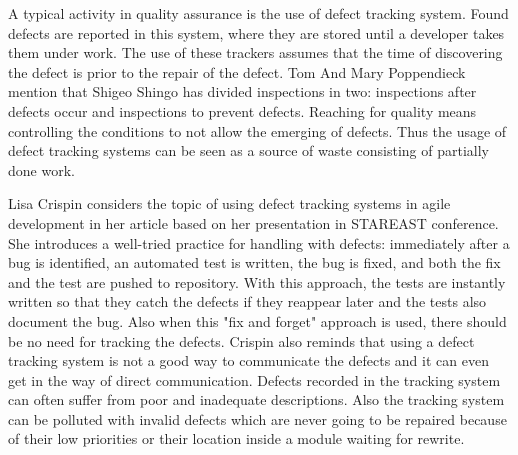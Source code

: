 A typical activity in quality assurance is the use of defect tracking system. Found defects are reported in this system, where they are stored until a developer takes them under work. The use of these trackers assumes that the time of discovering the defect is prior to the repair of the defect. Tom And Mary Poppendieck mention that Shigeo Shingo has divided inspections in two: inspections after defects occur and inspections to prevent defects. Reaching for quality means controlling the conditions to not allow the emerging of defects. Thus the usage of defect tracking systems can be seen as a source of waste consisting of partially done work.~\cite{poppendieck2006implementing}

Lisa Crispin considers the topic of using defect tracking systems in agile development in her article based on her presentation in STAREAST conference. She introduces a well-tried practice for handling with defects: immediately after a bug is identified, an automated test is written, the bug is fixed, and both the fix and the test are pushed to repository. With this approach, the tests are instantly written so that they catch the defects if they reappear later and the tests also document the bug. Also when this "fix and forget" approach is used, there should be no need for tracking the defects. Crispin also reminds that using a defect tracking system is not a good way to communicate the defects and it can even get in the way of direct communication. Defects recorded in the tracking system can often suffer from poor and inadequate descriptions. Also the tracking system can be polluted with invalid defects which are never going to be repaired because of their low priorities or their location inside a module waiting for rewrite.~\cite{stareastcrispin}

